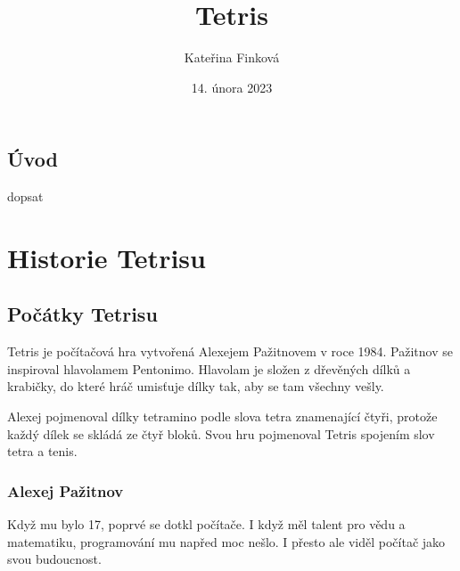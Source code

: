 \documentclass[12pt]{report}			%
\author{Kateřina Finková}
\title{Tetris}
\date{14. února 2023}
\begin{document}
	\mytitlepage						%
	
	
	
	
   {\tableofcontents\newpage}			%
	
\addtocounter{page}{1}		%
	\chapter*{Úvod}
	dopsat
			
	
	
	\part{Historie Tetrisu}
	
		\chapter{Počátky Tetrisu}
Tetris je počítačová hra vytvořená Alexejem Pažitnovem v roce 1984. Pažitnov se inspiroval hlavolamem Pentonimo. Hlavolam je složen z dřevěných dílků a krabičky, do které hráč umisťuje dílky tak, aby se tam všechny vešly.	\cite{Brown2016}

Alexej pojmenoval dílky tetramino podle slova tetra znamenající čtyři, protože každý dílek se skládá ze čtyř bloků. Svou hru pojmenoval Tetris spojením slov tetra a tenis.\cite{Brown2016}\\
	
			\section{Alexej Pažitnov}
Když mu bylo 17, poprvé se dotkl počítače. I když měl talent pro vědu a matematiku, programování mu napřed moc nešlo. I přesto ale viděl počítač jako svou budoucnost.\cite{Ackerman2016}
\end{document}
